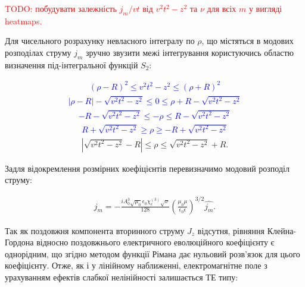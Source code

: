 \textcolor{red}{ TODO: побудувати залежність $ j_m / vt $ від 
$ v^2t^2 - z^2 $ та $ \nu $ для всіх $ m $ у вигляді heatmaps. }

Для чисельного розрахунку невласного інтегралу по $ \rho $, що містяться в 
модових розподілах струму $ j_m $ зручно звузити межі інтегрування 
користуючись областю визначення під-інтегральної функцій $ S_2 $:

\textcolor{blue} { \begin{equation*} \begin{aligned}
(\rho - R)^2 \leq v^2t^2 - z^2 \leq (\rho + R)^2
\end{aligned} \end{equation*} }
%
\textcolor{blue} { \begin{equation*} \begin{aligned}
| \rho - R | - \sqrt{v^2t^2 - z^2} \leq 0 \leq \rho + R - \sqrt{v^2t^2 - z^2}
\end{aligned} \end{equation*} }
%
\textcolor{blue} { \begin{equation*} \begin{aligned}
- R - \sqrt{v^2t^2 - z^2} \leq - \rho \leq R - \sqrt{v^2t^2 - z^2}
\end{aligned} \end{equation*} }
%
\textcolor{blue} { \begin{equation*} \begin{aligned}
R + \sqrt{v^2t^2 - z^2} \geq \rho \geq - R + \sqrt{v^2t^2 - z^2}
\end{aligned} \end{equation*} }
%
\begin{equation} \begin{aligned}
\left| \sqrt{v^2t^2 - z^2} - R \right| \leq \rho \leq \sqrt{v^2t^2 - z^2} + R.
\end{aligned} \end{equation}

Задля відокремлення розмірних коефіцієнтів перевизначимо модовий розподіл 
струму:

\begin{equation} \begin{aligned}
j_m = - \frac{i A_0^3 \sqrt{\mu_0} \epsilon_0 \chi_e^{(3)} \sqrt{\nu}}{128}
\left( \frac{\mu_0 \mu}{\epsilon_0 \epsilon} \right)^{3/2} \hat{j_m}.
\end{aligned} \end{equation}

Так як поздовжня компонента вторинного струму $ J_z $ відсутня, рівняння 
Клейна-Гордона відносно поздовжнього електричного еволюційного коефіцієнту 
є однорідним, що згідно методом функції Рімана дає нульовий розв'язок для
цього коефіцієнту. Отже, як і у лінійному наближенні, електромагнітне поле 
з урахуванням ефектів слабкої нелінійності залишається ТЕ типу:

